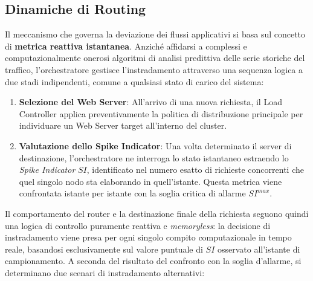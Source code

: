 ﻿\documentclass[a4paper,12pt]{article}
\begin{document}
\subsection{Dinamiche di Routing}
Il meccanismo che governa la deviazione dei flussi applicativi si basa sul concetto di \textbf{metrica reattiva istantanea}. Anziché affidarsi a complessi e computazionalmente onerosi algoritmi di analisi predittiva delle serie storiche del traffico, l'orchestratore gestisce l'instradamento attraverso una sequenza logica a due stadi indipendenti, comune a qualsiasi stato di carico del sistema:
\begin{enumerate}
    \item \textbf{Selezione del Web Server}: All'arrivo di una nuova richiesta, il Load Controller applica preventivamente la politica di distribuzione principale per individuare un Web Server target all'interno del cluster.
    \item \textbf{Valutazione dello Spike Indicator}: Una volta determinato il server di destinazione, l'orchestratore ne interroga lo stato istantaneo estraendo lo \textit{Spike Indicator} $SI$, identificato nel numero esatto di richieste concorrenti che quel singolo nodo sta elaborando in quell'istante. Questa metrica viene confrontata istante per istante con la soglia critica di allarme $SI^{max}$.
\end{enumerate}

Il comportamento del router e la destinazione finale della richiesta seguono quindi una logica di controllo puramente reattiva e \textit{memoryless}: la decisione di instradamento viene presa per ogni singolo compito computazionale in tempo reale, basandosi esclusivamente sul valore puntuale di $SI$ osservato all'istante di campionamento. 
A seconda del risultato del confronto con la soglia d'allarme, si determinano due scenari di instradamento alternativi:
\end{document}
